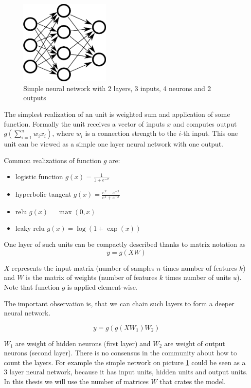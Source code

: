     \begin{figure}[h]
    \centerline{\includegraphics[width=0.4\textwidth]{images/neural_network}}
    \caption[Simple neural network with 2 layers, 3 inputs, 4 neurons and 2 outputs]{Simple neural network with 2 layers, 3 inputs, 4 neurons and 2 outputs\*} %
    \label{obr:siet}
    \end{figure}
    
    The simplest realization of an unit is weighted sum and application of some function. 
    Formally the unit receives a vector of inputs $x$ and computes output $g(\sum_{i=1}^n w_i x_i)$, 
    where $w_i$ is a connection strength to the $i$-th input.
    This one unit can be viewed as a simple one layer neural network with one output.
    
    Common realizations of function $g$ are: 
    \begin{itemize}
        \item logistic function $g(x) = \frac{1}{1+e^{-x}}$
        \item hyperbolic tangent $g(x)=\frac{e^x-e^{-x}}{e^x+e^{-x}}$
        \item relu $g(x) = \max(0,x)$ 
        \item leaky relu $g(x)=\log(1+\exp(x))$
    \end{itemize}
    
    One layer of such units can be compactly described thanks to matrix notation as
    $$y=g(X W)$$
    
    $X$ represents the input matrix (number of samples $n$ times number of features $k$) and $W$ is the matrix of weights (number of features $k$ times number of units $u$). Note that function $g$ is applied element-wise.
    
    The important observation is, that we can chain such layers to form a deeper neural network.
    
    $$y=g(g(X W_1) W_2)$$
    
    $W_1$ are weight of hidden neurons (first layer) and $W_2$ are weight of output neurons (second layer).
    There is no consensus in the community about how to count the layers. 
    For example the simple network on picture \ref{obr:siet} could be seen as a $3$ layer neural network,
    because it has input units, hidden units and output units.
    In this thesis we will use the number of matrices $W$ that crates the model.
    
